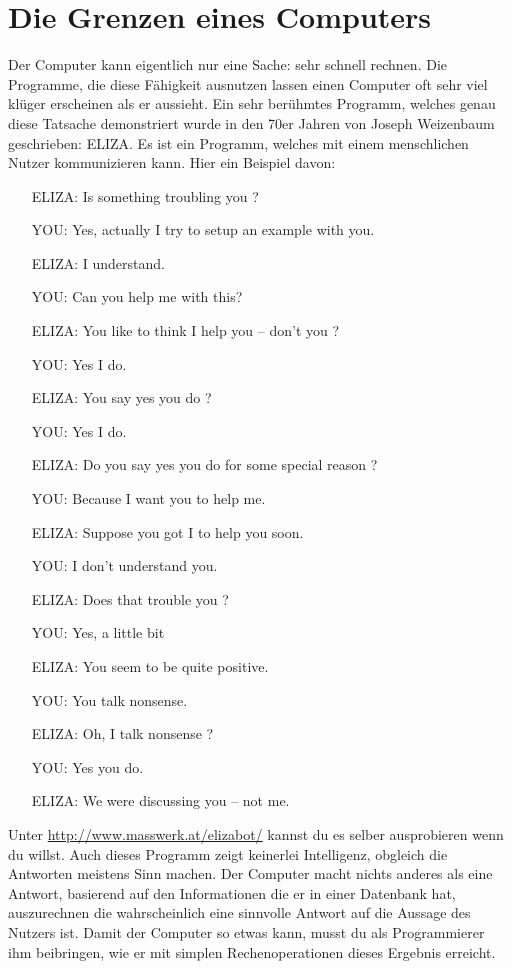 \chapter{Die Grenzen eines Computers}

Der Computer kann eigentlich nur eine Sache: sehr schnell rechnen. Die Programme, die diese Fähigkeit ausnutzen lassen einen Computer oft sehr viel klüger erscheinen als er aussieht. Ein sehr berühmtes Programm, welches genau diese Tatsache demonstriert wurde in den 70er Jahren von Joseph Weizenbaum geschrieben: ELIZA. Es ist ein Programm, welches mit einem menschlichen Nutzer kommunizieren kann. Hier ein Beispiel davon:

\begin{itemize}
	\item[ELIZA:] Is something troubling you ?
	\item[YOU:] Yes, actually I try to setup an example with you.
	\item[ELIZA:] I understand.
	\item[YOU:] Can you help me with this?
	\item[ELIZA:] You like to think I help you -- don't you ?
	\item[YOU:] Yes I do.
	\item[ELIZA:] You say yes you do ?
	\item[YOU:] Yes I do.
	\item[ELIZA:] Do you say yes you do for some special reason ?
	\item[YOU:] Because I want you to help me.
	\item[ELIZA:] Suppose you got I to help you soon.
	\item[YOU:] I don't understand you.
	\item[ELIZA:] Does that trouble you ?
	\item[YOU:] Yes, a little bit
	\item[ELIZA:] You seem to be quite positive.
	\item[YOU:] You talk nonsense.
	\item[ELIZA:] Oh, I talk nonsense ?
	\item[YOU:] Yes you do.
	\item[ELIZA:] We were discussing you -- not me.
\end{itemize}

Unter \url{http://www.masswerk.at/elizabot/} kannst du es selber ausprobieren wenn du willst. Auch dieses Programm zeigt keinerlei Intelligenz, obgleich die Antworten meistens Sinn machen. Der Computer macht nichts anderes als eine Antwort, basierend auf den Informationen die er in einer Datenbank hat, auszurechnen die wahrscheinlich eine sinnvolle Antwort auf die Aussage des Nutzers ist. Damit der Computer so etwas kann, musst du als Programmierer ihm beibringen, wie er mit simplen Rechenoperationen dieses Ergebnis erreicht.

